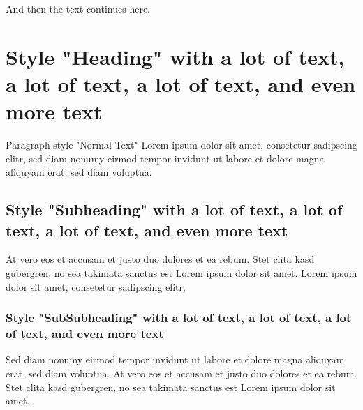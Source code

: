 And then the text continues here.
\lipsum[3]
 
\chapter{Style "Heading" with a lot of text, a lot of text, a lot of
text, and even more text}
Paragraph style "Normal Text" Lorem ipsum dolor sit amet,
consetetur sadipscing elitr, sed diam nonumy eirmod tempor invidunt
ut labore et dolore magna aliquyam erat, sed diam voluptua.
\section{Style "Subheading" with a lot of text, a lot of text, a
lot of text, and even more text}
At vero eos et accusam et justo duo dolores et ea rebum. Stet
clita kasd gubergren, no sea takimata sanctus est Lorem ipsum dolor
sit amet. Lorem ipsum dolor sit amet, consetetur sadipscing
elitr,
\subsection{Style "SubSubheading" with a lot of text, a lot of text, a
lot of text, and even more text}
Sed diam nonumy eirmod tempor invidunt ut labore et dolore magna
aliquyam erat, sed diam voluptua. At vero eos et accusam et justo
duo dolores et ea rebum. Stet clita kasd gubergren, no sea takimata
sanctus est Lorem ipsum dolor sit amet.
